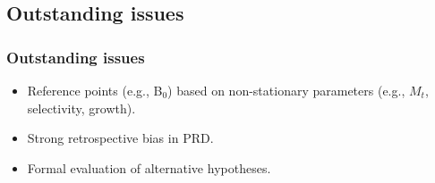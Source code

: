 
\subsection{Outstanding issues} %
\label{sub:outstanding_issues}
\begin{frame}[t]\frametitle{Outstanding issues}
	\begin{itemize}
		\item<+-> Reference points (e.g., B$_0$) based on non-stationary parameters (e.g., $M_t$, selectivity, growth).
		\item<+-> Strong retrospective bias in PRD.
		\item<+-> Formal evaluation of alternative hypotheses.
	\end{itemize}
\end{frame}


